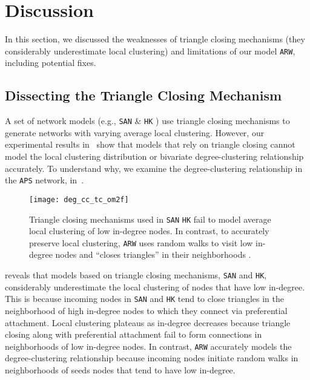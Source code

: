 
\section{Discussion}
\label{sec:Discussion}
In this section, we discussed the weaknesses of triangle closing mechanisms
(they considerably underestimate local clustering) and limitations of our model
\texttt{ARW}, including potential fixes.


\subsection{Dissecting the Triangle Closing Mechanism}
\label{ss:tc}

A set of network models (e.g., \texttt{SAN} \cite{gong2012evolution} \& \texttt{HK} \cite{holme2002growing})
use triangle closing mechanisms to generate networks with
varying average local clustering. However, our experimental results
in~ show that models that rely on triangle closing
cannot model the local clustering distribution or bivariate degree-clustering
relationship accurately. To understand why, we examine the degree-clustering
relationship in the \texttt{APS} network, in~.
\begin{figure}[h]
    \centering
    \vspace{-7pt}
    \texttt{[image: deg\_cc\_tc\_om2f]}
    \caption{Triangle closing mechanisms used in \texttt{SAN} \texttt{HK} fail to
    model average local clustering of low in-degree nodes. In contrast,
    to accurately preserve local clustering, \texttt{ARW} uses {random walks} to visit
    low in-degree nodes and ``closes triangles'' in their neighborhoods .}
    \label{fig:triangle_closing}
    \vspace{-5pt}
\end{figure}

 reveals that models based on triangle closing mechanisms,
\texttt{SAN} and \texttt{HK}, considerably underestimate the local clustering of
nodes that have low in-degree. This is because incoming nodes in \texttt{SAN} and \texttt{HK}
tend to close triangles in the neighborhood of high in-degree nodes to which they
connect via preferential attachment. Local clustering plateaus as in-degree decreases because
triangle closing along with preferential attachment fail to form connections in neighborhoods
of low in-degree nodes. In contrast, \texttt{ARW} accurately models the degree-clustering relationship
because incoming nodes initiate random walks in neighborhoods of seeds nodes that tend to have
low in-degree.


